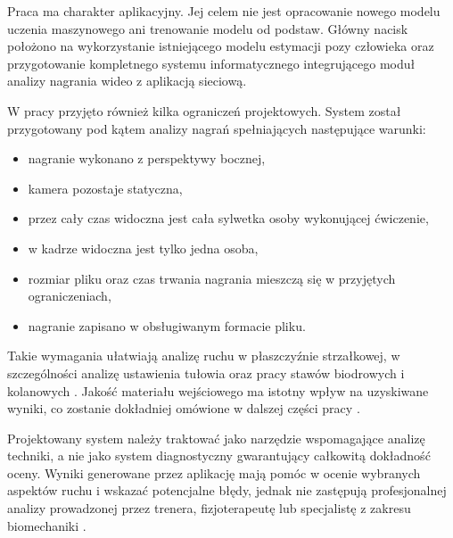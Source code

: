 Praca ma charakter aplikacyjny. Jej celem nie jest opracowanie nowego modelu uczenia maszynowego ani trenowanie modelu od podstaw. Główny nacisk położono na wykorzystanie istniejącego modelu estymacji pozy człowieka oraz przygotowanie kompletnego systemu informatycznego integrującego moduł analizy nagrania wideo z aplikacją sieciową.

W pracy przyjęto również kilka ograniczeń projektowych. System został przygotowany pod kątem analizy nagrań spełniających następujące warunki:
\begin{itemize}
\item nagranie wykonano z perspektywy bocznej,
\item kamera pozostaje statyczna,
\item przez cały czas widoczna jest cała sylwetka osoby wykonującej ćwiczenie,
\item w kadrze widoczna jest tylko jedna osoba,
\item rozmiar pliku oraz czas trwania nagrania mieszczą się w przyjętych ograniczeniach,
\item nagranie zapisano w obsługiwanym formacie pliku.
\end{itemize}

Takie wymagania ułatwiają analizę ruchu w płaszczyźnie strzałkowej, w szczególności analizę ustawienia tułowia oraz pracy stawów biodrowych i kolanowych \cite{hanen2025deadlift,wade2022markerless}. Jakość materiału wejściowego ma istotny wpływ na uzyskiwane wyniki, co zostanie dokładniej omówione w dalszej części pracy \cite{wade2022markerless}.

Projektowany system należy traktować jako narzędzie wspomagające analizę techniki, a nie jako system diagnostyczny gwarantujący całkowitą dokładność oceny. Wyniki generowane przez aplikację mają pomóc w ocenie wybranych aspektów ruchu i wskazać potencjalne błędy, jednak nie zastępują profesjonalnej analizy prowadzonej przez trenera, fizjoterapeutę lub specjalistę z zakresu biomechaniki \cite{wade2022markerless}.
